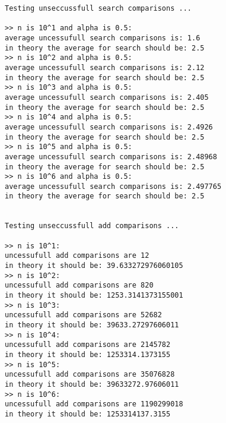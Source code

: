\documentclass[]{article}
\begin{document}
\begin{latin}
\begin{lstlisting}
Testing unseccussfull search comparisons ...

>> n is 10^1 and alpha is 0.5:
average uncessufull search comparisons is: 1.6
in theory the average for search should be: 2.5
>> n is 10^2 and alpha is 0.5:
average uncessufull search comparisons is: 2.12
in theory the average for search should be: 2.5
>> n is 10^3 and alpha is 0.5:
average uncessufull search comparisons is: 2.405
in theory the average for search should be: 2.5
>> n is 10^4 and alpha is 0.5:
average uncessufull search comparisons is: 2.4926
in theory the average for search should be: 2.5
>> n is 10^5 and alpha is 0.5:
average uncessufull search comparisons is: 2.48968
in theory the average for search should be: 2.5
>> n is 10^6 and alpha is 0.5:
average uncessufull search comparisons is: 2.497765
in theory the average for search should be: 2.5
    

Testing unseccussfull add comparisons ...
    
>> n is 10^1:
uncessufull add comparisons are 12
in theory it should be: 39.633272976060105
>> n is 10^2:
uncessufull add comparisons are 820
in theory it should be: 1253.3141373155001
>> n is 10^3:
uncessufull add comparisons are 52682
in theory it should be: 39633.27297606011
>> n is 10^4:
uncessufull add comparisons are 2145782
in theory it should be: 1253314.1373155
>> n is 10^5:
uncessufull add comparisons are 35076828
in theory it should be: 39633272.97606011
>> n is 10^6:
uncessufull add comparisons are 1190299018
in theory it should be: 1253314137.3155    
\end{lstlisting}
\end{latin}
    
\end{document}
